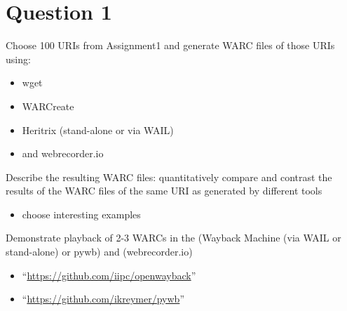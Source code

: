 \section{Question 1}
\label{part1}

Choose 100 URIs from Assignment1 and generate WARC files of those URIs using:

\begin{itemize}
\item wget
\item WARCreate
\item Heritrix (stand-alone or via WAIL)
\item and webrecorder.io
\end{itemize}
Describe the resulting WARC files: quantitatively compare and contrast the results of the WARC files of the same URI as generated by different tools
\begin{itemize}
\item choose interesting examples
\end{itemize}
Demonstrate playback of 2-3 WARCs in the (Wayback Machine (via WAIL or stand-alone) or pywb) and (webrecorder.io)
\begin{itemize}
\item ``\url{https://github.com/iipc/openwayback}''
\item ``\url{https://github.com/ikreymer/pywb}''
\end{itemize}

